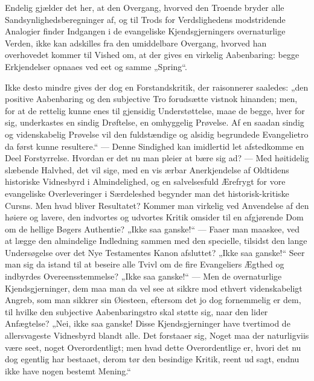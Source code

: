 \documentclass[12pt,a4paper]{book}
\begin{document}
Endelig gjælder det her, at den Overgang, hvorved den Troende bryder alle
Sandsynlighedsberegninger af, og til Trods for Verdslighedens modstridende Analogier
finder Indgangen i de evangeliske Kjendsgjerningers overnaturlige Verden, ikke kan
adskilles fra den umiddelbare Overgang, hvorved han overhovedet kommer til Vished om, at
der gives en virkelig Aabenbaring: begge Erkjendelser opnaaes ved eet og samme „Spring“.

Ikke desto mindre gives der dog en Forstandskritik, der raisonnerer saaledes: „den
positive Aabenbaring og den subjective
Tro forudsætte vistnok hinanden; men, for at de rettelig kunne enes til gjensidig
Understøttelse, maae de begge, hver for sig, underkastes en sindig Drøftelse, en
omhyggelig Prøvelse. Af en saadan sindig og videnskabelig Prøvelse vil den fuldstændige
og alsidig begrundede Evangelietro da først kunne resultere.“ --- Denne Sindighed kan
imidlertid let afstedkomme en Deel Forstyrrelse. Hvordan er det nu man pleier at bære
sig ad? --- Med høitidelig slæbende Halvhed, det vil sige, med en vis ærbar
Anerkjendelse af Oldtidens historiske Vidnesbyrd i Almindelighed, og en salvelsesfuld
Ærefrygt for vore evangeliske Overleveringer i Særdeleshed begynder man det
historisk-kritiske Cursns. Men hvad bliver Resultatet? Kommer man virkelig ved
Anvendelse af den høiere og lavere, den indvortes og udvortes Kritik omsider til en
afgjørende Dom om de hellige Bøgers Authentie? „Ikke saa ganske!“ --- Faaer man maaskee,
ved at lægge den almindelige Indledning sammen med den specielle, tilsidst den lange
Undersøgelse over det Nye Testamentes Kanon afsluttet? „Ikke saa ganske!“ Seer man sig
da istand til at beseire alle Tvivl om de fire Evangeliers Ægthed og indbyrdes
Overeensstemmelse? „Ikke saa ganske!“ --- Men de overnaturlige Kjendsgjerninger, dem maa
man da vel see at sikkre mod ethvert videnskabeligt Angreb, som man sikkrer sin
Øiesteen, eftersom det jo dog fornemmelig er dem, til hvilke den subjective
Aabenbaringstro skal støtte sig, naar den lider Anfægtelse? „Nei, ikke saa ganske! Disse
Kjendsgjerninger have tvertimod de allersvageste Vidnesbyrd blandt alle. Det forstaaer
sig, Noget maa der naturligviis være seet, noget Overordentligt; men hvad dette
Overordentlige er, hvori det nu dog egentlig har bestaaet, derom tør den besindige
Kritik, reent ud sagt, endnu ikke have nogen bestemt Mening.“
\end{document}
